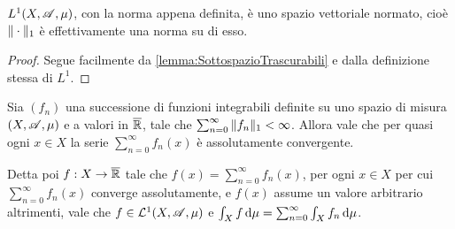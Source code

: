 \begin{remark}
	$L^1(X,\mathscr A,\mu)$, con la norma appena definita, è uno spazio vettoriale normato, cioè $\Vert \cdot\Vert_1$ è effettivamente una norma su di esso.
\end{remark}
\begin{proof}
	Segue facilmente da \cref{lemma:SottospazioTrascurabili} e dalla definizione stessa di $L^1$.
\end{proof}



\begin{theorem}
	Sia $(f_n)$ una successione di funzioni integrabili definite su uno spazio di misura $(X,\mathscr A,\mu)$ e a valori in $\overline{\mathbb R}$, tale che $\sum_{n=0}^{\infty}\Vert f_n\Vert_1<\infty$. Allora vale che per quasi ogni $x\in X$ la serie $\sum_{n=0}^\infty f_n(x)$ è assolutamente convergente. 
	
	Detta poi $f:X\to\overline{\mathbb R}$ tale che $f(x)=\sum_{n=0}^\infty f_n(x)$, per ogni $x\in X$ per cui $\sum_{n=0}^\infty f_n(x)$ converge assolutamente, e $f(x)$ assume un valore arbitrario altrimenti, vale che $f\in \mathcal L^1(X,\mathscr A,\mu)$ e $\int_X f\,\mathrm d\mu=\sum_{n=0}^\infty \int_X f_n\,\mathrm d\mu$.
\end{theorem}

